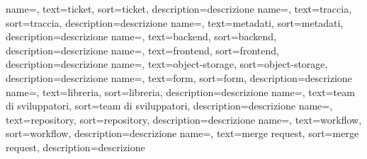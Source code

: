





{
  name=,
  text=ticket,
  sort=ticket,
  description={descrizione}
}
{
  name=,
  text=traccia,
  sort=traccia,
  description={descrizione}
}
{
  name=,
  text=metadati,
  sort=metadati,
  description={descrizione}
}
{
  name=,
  text=backend,
  sort=backend,
  description={descrizione}
}
{
  name=,
  text=frontend,
  sort=frontend,
  description={descrizione}
}
{
  name=,
  text=object-storage,
  sort=object-storage,
  description={descrizione}
}
{
  name=,
  text=form,
  sort=form,
  description={descrizione}
}
{
  name=,
  text=libreria,
  sort=libreria,
  description={descrizione}
}
{
  name=,
  text=team di sviluppatori,
  sort=team di sviluppatori,
  description={descrizione}
}
{
  name=,
  text=repository,
  sort=repository,
  description={descrizione}
}
{
  name=,
  text=workflow,
  sort=workflow,
  description={descrizione}
}
{
  name=,
  text=merge request,
  sort=merge request,
  description={descrizione}
}
